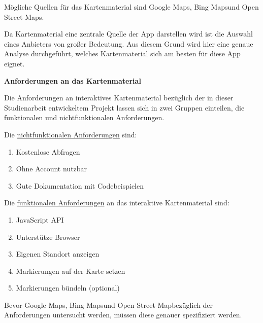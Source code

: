 Mögliche Quellen für das Kartenmaterial sind \glqq Google Maps\grqq, \glqq Bing Maps\grqq  und \glqq Open Street Maps\grqq.

Da Kartenmaterial eine zentrale Quelle der App darstellen wird ist die Auswahl eines Anbieters von großer Bedeutung. Aus diesem Grund wird hier eine genaue Analyse durchgeführt, welches Kartenmaterial sich am besten für diese App eignet.

\textbf{Anforderungen an das Kartenmaterial}

Die Anforderungen an interaktives Kartenmaterial bezüglich der in dieser Studienarbeit entwickeltem Projekt lassen sich in zwei Gruppen einteilen, die funktionalen und nichtfunktionalen Anforderungen.

Die \underline{nichtfunktionalen Anforderungen} sind:
\begin{enumerate}
\item Kostenlose Abfragen
\item Ohne Account nutzbar
\item Gute Dokumentation mit Codebeispielen
\end{enumerate}

Die \underline{funktionalen Anforderungen} an das interaktive Kartenmaterial sind:
\begin{enumerate}
\item JavaScript API
\item Unterstütze Browser
\item Eigenen Standort anzeigen
\item Markierungen auf der Karte setzen
\item Markierungen bündeln (optional)
\end{enumerate}

Bevor \glqq Google Maps\grqq, \glqq Bing Maps\grqq  und \glqq Open Street Map\grqq bezüglich der Anforderungen untersucht werden, müssen diese genauer spezifiziert werden.

